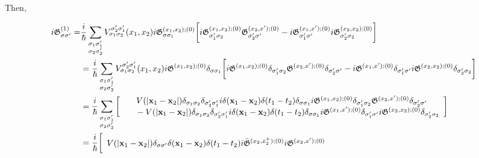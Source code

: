\documentclass{homework}
\begin{document}
Then,

\begin{equation}
    \begin{split}
         i \mathfrak{G}^{(1)}_{\sigma \sigma'} =& \frac{i}{\hbar} \sum_{\substack{\sigma_1 \sigma'_1 \\
        \sigma_2 \sigma'_2}} V_{\sigma_1\sigma_2}^{\sigma'_2\sigma'_1}(x_1,x_2) i \mathfrak{G}^{(x_1, x_2); (0)}_{\sigma\sigma_1} \bigg[ i \mathfrak{G}^{(x_1,x_2); (0)}_{\sigma'_1\sigma_2}
        \mathfrak{G}^{(x_2, x'); (0)}_{\sigma'_2\sigma'} 
         -
        i \mathfrak{G}^{(x_1,x'); (0)}_{\sigma'_1\sigma'} 
        i \mathfrak{G}^{(x_2, x_2); (0)}_{\sigma'_2\sigma_2} \bigg] \\
        &=\frac{i}{\hbar} \sum_{\substack{\sigma_1 \sigma'_1 \\
        \sigma_2 \sigma'_2}} V_{\sigma_1\sigma_2}^{\sigma'_2\sigma'_1}(x_1,x_2) i \mathfrak{G}^{(x_1, x_2); (0)} \delta_{\sigma \sigma_1} \bigg[ i \mathfrak{G}^{(x_1,x_2); (0)} \delta_{\sigma'_1\sigma_2}
        \mathfrak{G}^{(x_2, x'); (0)} \delta_{\sigma'_2\sigma'} 
         -
        i \mathfrak{G}^{(x_1,x'); (0)}\delta_{\sigma'_1\sigma'} 
        i \mathfrak{G}^{(x_2, x_2); (0)}\delta_{\sigma'_2\sigma_2} \bigg] \\
        &=\frac{i}{\hbar} \sum_{\substack{\sigma_1 \sigma'_1 \\
        \sigma_2 \sigma'_2}} \bigg[\begin{array}{cc}
            V(|{\bf x}_1 - {\bf x}_2|)\delta_{\sigma_1\sigma_2} \delta_{\sigma'_2\sigma'_1} i \delta({\bf x}_1 - {\bf x}_2) \delta(t_1-t_2)\delta_{\sigma \sigma_1}i \mathfrak{G}^{(x_1,x_2); (0)} \delta_{\sigma'_1\sigma_2}
            \mathfrak{G}^{(x_2, x'); (0)} \delta_{\sigma'_2\sigma'} \\
             \textnormal{ } \textnormal{ } \textnormal{ } \textnormal{ }       - V(|{\bf x}_1 - {\bf x}_2|)\delta_{\sigma_1\sigma_2} \delta_{\sigma'_2\sigma'_1} i \delta({\bf x}_1 - {\bf x}_2) \delta(t_1-t_2)\delta_{\sigma \sigma_1}
                i \mathfrak{G}^{(x_1,x'); (0)}\delta_{\sigma'_1\sigma'} 
                i \mathfrak{G}^{(x_2, x_2); (0)}\delta_{\sigma'_2\sigma_2} 
        \end{array} \bigg] \\
        &= \frac{i}{\hbar} \bigg[\begin{array}{cc}
            V(|{\bf x}_1 - {\bf x}_2|)\delta_{\sigma \sigma'} \delta({\bf x}_1 - {\bf x}_2) \delta(t_1-t_2) i \bar{\mathfrak{G}}^{(x_2,x_2^+); (0)} 
            i \mathfrak{G}^{(x_2, x'); (0)} \\

\end{array}
\end{split}
\end{equation}
\end{document}
